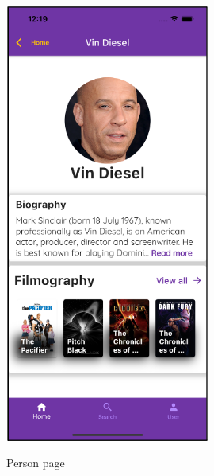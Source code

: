 \documentclass[12pt, a4paper]{article}
\numberwithin{figure}{section}
\begin{document}
\begin{center}
	\begin{minipage}[t]{0.4\textwidth}
		\begin{figure}[H]
			\centering
			\includegraphics[width=0.6\textwidth]{images/final/actor.png}\\
			\caption{Person page}
		\end{figure}
	\end{minipage}
	\hspace{0.015\linewidth}
	\begin{minipage}[t]{0.4\textwidth}
		\begin{figure}[H]
			\centering

\end{figure}
\end{minipage}
\end{center}
\end{document}
